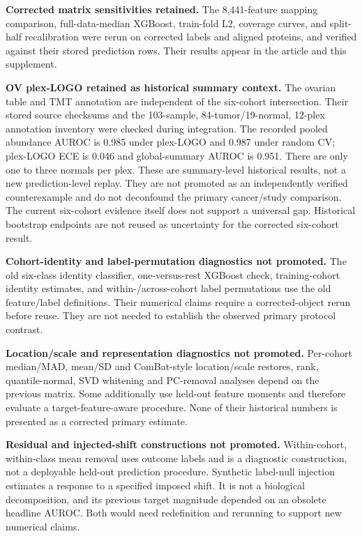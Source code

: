 \documentclass[11pt]{article}
\begin{document}
\textbf{Corrected matrix sensitivities retained.}
The 8,441-feature mapping comparison, full-data-median XGBoost,
train-fold L2, coverage curves, and split-half recalibration were rerun
on corrected labels and aligned proteins, and verified against their
stored prediction rows. Their results appear in the article and this
supplement.

\textbf{OV plex-LOGO retained as historical summary context.}
The ovarian table and TMT annotation are independent of the six-cohort
intersection. Their stored source checksums and the 103-sample,
84-tumor/19-normal, 12-plex annotation inventory were checked during
integration. The recorded pooled abundance AUROC is 0.985 under
plex-LOGO and 0.987 under random CV; plex-LOGO ECE is 0.046 and
global-summary AUROC is 0.951. There are only one to three normals per
plex. These are summary-level historical results, not a new
prediction-level replay. They are not promoted as an independently verified
counterexample and do not deconfound the primary cancer/study comparison.
The current six-cohort evidence itself does not support a universal gap.
Historical bootstrap endpoints are
not reused as uncertainty for the corrected six-cohort result.

\textbf{Cohort-identity and label-permutation diagnostics not promoted.}
The old six-class identity classifier, one-versus-rest XGBoost check,
training-cohort identity estimates, and within-/across-cohort label
permutations use the old feature/label definitions. Their numerical
claims require a corrected-object rerun before reuse. They are not
needed to establish the observed primary protocol contrast.

\textbf{Location/scale and representation diagnostics not promoted.}
Per-cohort median/MAD, mean/SD and ComBat-style location/scale restores,
rank, quantile-normal, SVD whitening and PC-removal analyses depend on
the previous matrix. Some additionally use held-out feature moments
and therefore evaluate a target-feature-aware procedure. None of their
historical numbers is presented as a corrected primary estimate.

\textbf{Residual and injected-shift constructions not promoted.}
Within-cohort, within-class mean removal uses outcome labels and is a
diagnostic construction, not a deployable held-out prediction procedure.
Synthetic label-null injection estimates a response to a specified
imposed shift. It is not a biological decomposition, and its previous
target magnitude depended on an obsolete headline AUROC. Both would
need redefinition and rerunning to support new numerical claims.
\end{document}
